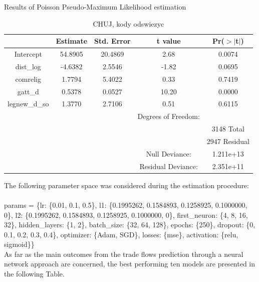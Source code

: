 \documentclass{Trade_template}
\numberwithin{equation}{section}
\begin{document}
\begin{table}[H]
\centering
\caption{Results of Poisson Pseudo-Maximum Likelihood estimation}
\begin{tabular}{ccccc}
  \hline
 & Estimate & Std. Error & t value & Pr($>$$|$t$|$) \\ 
  \hline
Intercept & 54.8905 & 20.4869 & 2.68 & 0.0074 \\ 
  dist\_log & -4.6382 & 2.5546 & -1.82 & 0.0695 \\ 
  comrelig & 1.7794 & 5.4022 & 0.33 & 0.7419 \\ 
  gatt\_d & 0.5378 & 0.0527 & 10.20 & 0.0000 \\  
  legnew\_d\_so & 1.3770 & 2.7106 & 0.51 & 0.6115 \\ 
   \hline
& & & Degrees of Freedom: & \\
& & & & 3148 Total \\
& & & & 2947 Residual \\
& & & Null Deviance:	  &  1.211e+13 \\
& & & Residual Deviance: & 2.351e+11 	\\
\hline
\end{tabular}
\caption*{\tiny{CHUJ, kody odswiezyc}}
\end{table}


The following parameter space was considered during the estimation procedure:\\ \\
params = \{lr: \{0.01, 0.1, 0.5\},
        l1: \{0.1995262, 0.1584893, 0.1258925, 0.1000000, 0\},
        l2: \{0.1995262, 0.1584893, 0.1258925, 0.1000000, 0\},
        first\_neuron: \{4, 8, 16, 32\},
        hidden\_layers: \{1, 2\},
        batch\_size: \{32, 64, 128\},
        epochs: \{250\},
        dropout: \{0, 0.1, 0.2, 0.3, 0.4\},
        optimizer: \{Adam, SGD\},
        losses: \{mse\},
        activation: \{relu, sigmoid\}\} \\


As far as the main outcomes from the trade flows prediction through a neural network approach are concerned, the best performing ten models are presented in the following  Table. 
\end{document}
